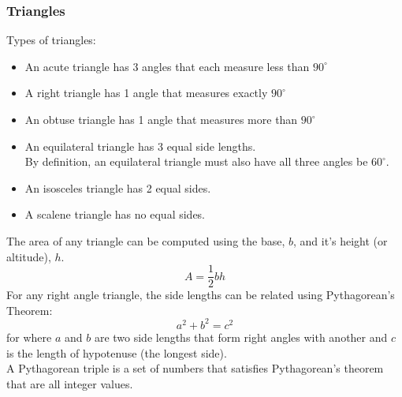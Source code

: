 \documentclass[11pt, fleqn]{article}
\begin{document}
\subsubsection{Triangles}
Types of triangles:
\begin{itemize}
    \item An acute triangle has 3 angles that each measure less than $90^\circ$
    \item A right triangle has 1 angle that measures exactly $90^\circ$
    \item An obtuse triangle has 1 angle that measures more than $90^\circ$
    \item An equilateral triangle has 3 equal side lengths.\\
    By definition, an equilateral triangle must also have all three angles be $60^\circ$.
    \item An isosceles triangle has 2 equal sides.
    \item A scalene triangle has no equal sides.
\end{itemize}
The area of any triangle can be computed using the base, $b$, and it's height (or altitude), $h$.
$$A=\frac{1}{2}bh$$
For any right angle triangle, the side lengths can be related using Pythagorean's Theorem:
$$a^2+b^2=c^2$$
for where $a$ and $b$ are two side lengths that form right angles with another and $c$ is the length of hypotenuse (the longest side).\\
A Pythagorean triple is a set of numbers that satisfies Pythagorean's theorem that are all integer values.
\end{document}
